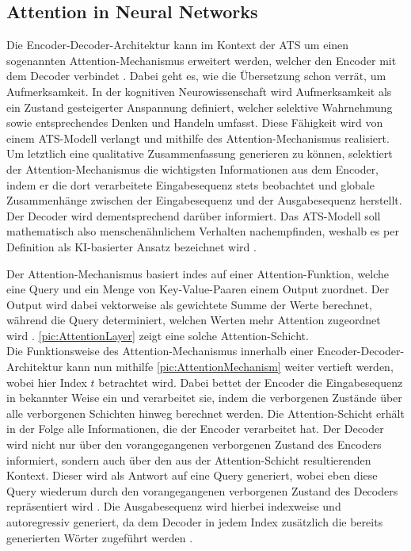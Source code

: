 \subsection{Attention in Neural Networks}
\noindent
Die Encoder-Decoder-Architektur kann im Kontext der \ac{ATS} um einen sogenannten Attention-Mechanismus erweitert werden, welcher den Encoder mit dem Decoder verbindet \cite{VAS17}. Dabei geht es, wie die Übersetzung schon verrät, um Aufmerksamkeit. In der kognitiven Neurowissenschaft wird Aufmerksamkeit als ein Zustand gesteigerter Anspannung definiert, welcher selektive Wahrnehmung sowie entsprechendes Denken und Handeln umfasst. Diese Fähigkeit wird von einem \ac{ATS}-Modell verlangt und mithilfe des Attention-Mechanismus realisiert. Um letztlich eine qualitative Zusammenfassung generieren zu können, selektiert der Attention-Mechanismus die wichtigsten Informationen aus dem Encoder, indem er die dort verarbeitete Eingabesequenz stets beobachtet und globale Zusammenhänge zwischen der Eingabesequenz und der Ausgabesequenz herstellt. Der Decoder wird dementsprechend darüber informiert. Das \ac{ATS}-Modell soll mathematisch also menschenähnlichem Verhalten nachempfinden, weshalb es per Definition als KI-basierter Ansatz bezeichnet wird \cite[S.~389]{ZHA20}.
\newpage

\noindent
Der Attention-Mechanismus basiert indes auf einer Attention-Funktion, welche eine Query und ein Menge von Key-Value-Paaren einem Output zuordnet. Der Output wird dabei vektorweise als gewichtete Summe der Werte berechnet, während die Query determiniert, welchen Werten mehr Attention zugeordnet wird \cite{VAS17}. \autoref{pic:AttentionLayer} zeigt eine solche Attention-Schicht.\\

\noindent
Die Funktionsweise des Attention-Mechanismus innerhalb einer Encoder-Decoder-Architektur kann nun mithilfe \autoref{pic:AttentionMechanism} weiter vertieft werden, wobei hier Index $t$ betrachtet wird. Dabei bettet der Encoder die Eingabesequenz in bekannter Weise ein und verarbeitet sie, indem die verborgenen Zustände über alle verborgenen Schichten hinweg berechnet werden. Die Attention-Schicht erhält in der Folge alle Informationen, die der Encoder verarbeitet hat. Der Decoder wird nicht nur über den vorangegangenen verborgenen Zustand des Encoders informiert, sondern auch über den aus der Attention-Schicht resultierenden Kontext. Dieser wird als Antwort auf eine Query generiert, wobei eben diese Query wiederum durch den vorangegangenen verborgenen Zustand des Decoders repräsentiert wird \cite[S.~394]{ZHA20}. Die Ausgabesequenz wird hierbei indexweise und autoregressiv generiert, da dem Decoder in jedem Index zusätzlich die bereits generierten Wörter zugeführt werden \cite{VAS17}.\\

